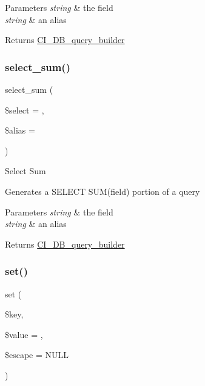 \begin{DoxyParams}{Parameters}
{\em string} & the field \\
\hline
{\em string} & an alias \\
\hline
\end{DoxyParams}
\begin{DoxyReturn}{Returns}
\mbox{\hyperlink{class_c_i___d_b__query__builder}{C\+I\+\_\+\+D\+B\+\_\+query\+\_\+builder}} 
\end{DoxyReturn}
\mbox{\label{class_c_i___d_b__query__builder_a42348c349cf2fa7ca0210087efcf98d3}} 
\subsubsection{\texorpdfstring{select\+\_\+sum()}{select\_sum()}}
{\footnotesize\ttfamily select\+\_\+sum (\begin{DoxyParamCaption}\item[{}]{\$select = {\ttfamily \textquotesingle{}\textquotesingle{}},  }\item[{}]{\$alias = {\ttfamily \textquotesingle{}\textquotesingle{}} }\end{DoxyParamCaption})}

Select Sum

Generates a S\+E\+L\+E\+CT S\+U\+M(field) portion of a query


\begin{DoxyParams}{Parameters}
{\em string} & the field \\
\hline
{\em string} & an alias \\
\hline
\end{DoxyParams}
\begin{DoxyReturn}{Returns}
\mbox{\hyperlink{class_c_i___d_b__query__builder}{C\+I\+\_\+\+D\+B\+\_\+query\+\_\+builder}} 
\end{DoxyReturn}
\mbox{\label{class_c_i___d_b__query__builder_a1589c46344f3a216a129cf65659b117c}} 
\subsubsection{\texorpdfstring{set()}{set()}}
{\footnotesize\ttfamily set (\begin{DoxyParamCaption}\item[{}]{\$key,  }\item[{}]{\$value = {\ttfamily \textquotesingle{}\textquotesingle{}},  }\item[{}]{\$escape = {\ttfamily NULL} }\end{DoxyParamCaption})}

